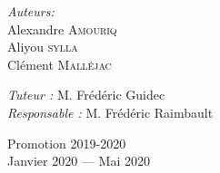 \documentclass[a4paper,10pt]{article}
\begin{document}
\begin{titlepage}
\begin{sffamily}
\begin{center}
    \noindent
    \begin{minipage}{.39\textwidth}
        \begin{flushleft} \large
            \emph{Auteurs:} \\
            Alexandre \textsc{Amouriq} \\
    		Aliyou \textsc{sylla} \\
    		Clément \textsc{Malléjac} \\ 
        \end{flushleft}
    \end{minipage}
    \hfill
    \begin{minipage}{.59\textwidth}
        \begin{flushright} \large
            \emph{Tuteur :} M. Frédéric Guidec \\
            \emph{Responsable :} M. Frédéric Raimbault \\
        \end{flushright}
    \end{minipage}
    
    \vfill %
    
     
    {\large } Promotion 2019-2020\\{Janvier 2020 — Mai 2020}
 \end{center}
  \end{sffamily}
\end{titlepage}

\newpage
\end{document}
